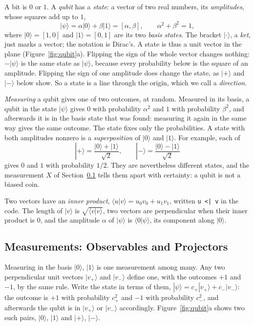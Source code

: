\documentclass[11pt]{article}
\newcommand{\hs}{\lstinline[style=hask,basicstyle=\ttfamily,frame=none]}
\begin{document}
A bit is $0$ or $1$. A \emph{qubit} has a \emph{state}: a vector of two real numbers, its \emph{amplitudes}, whose squares add up to $1$,
\[
  |\psi\rangle = \alpha|0\rangle + \beta|1\rangle = [\alpha, \beta], \qquad \alpha^2 + \beta^2 = 1,
\]
where $|0\rangle = [1, 0]$ and $|1\rangle = [0, 1]$ are its two \emph{basis states}. The bracket $|\cdot\rangle$, a \emph{ket}, just marks a vector; the notation is Dirac's. A state is thus a unit vector in the plane (Figure~\ref{fig:qubit}a). Flipping the sign of the whole vector changes nothing: $-|\psi\rangle$ is the same state as $|\psi\rangle$, because every probability below is the square of an amplitude. Flipping the sign of one amplitude does change the state, as $|{+}\rangle$ and $|{-}\rangle$ below show. So a state is a line through the origin, which we call a \emph{direction}.

\emph{Measuring} a qubit gives one of two outcomes, at random. Measured in its basis, a qubit in the state $|\psi\rangle$ gives $0$ with probability $\alpha^2$ and $1$ with probability $\beta^2$, and afterwards it is in the basis state that was found: measuring it again in the same way gives the same outcome. The state fixes only the probabilities. A state with both amplitudes nonzero is a \emph{superposition} of $|0\rangle$ and $|1\rangle$. For example, each of
\[
  |{+}\rangle = \frac{|0\rangle + |1\rangle}{\sqrt2}, \qquad |{-}\rangle = \frac{|0\rangle - |1\rangle}{\sqrt2}
\]
gives $0$ and $1$ with probability $1/2$. They are nevertheless different states, and the measurement $X$ of Section~\ref{app:measure} tells them apart with certainty: a qubit is not a biased coin.

Two vectors have an \emph{inner product}, $\langle u|v\rangle = u_0 v_0 + u_1 v_1$, written \hs!u <| v! in the code. The length of $|v\rangle$ is $\sqrt{\langle v|v\rangle}$, two vectors are perpendicular when their inner product is $0$, and the amplitude $\alpha$ of $|\psi\rangle$ is $\langle 0|\psi\rangle$, its component along $|0\rangle$.

\subsection{Measurements: Observables and Projectors}\label{app:measure}

Measuring in the basis $|0\rangle$, $|1\rangle$ is one measurement among many. Any two perpendicular unit vectors $|v_+\rangle$ and $|v_-\rangle$ define one, with the outcomes $+1$ and $-1$, by the same rule. Write the state in terms of them, $|\psi\rangle = c_+|v_+\rangle + c_-|v_-\rangle$: the outcome is $+1$ with probability $c_+^2$ and $-1$ with probability $c_-^2$, and afterwards the qubit is in $|v_+\rangle$ or $|v_-\rangle$ accordingly. Figure~\ref{fig:qubit}a shows two such pairs, $|0\rangle$, $|1\rangle$ and $|{+}\rangle$, $|{-}\rangle$.
\end{document}
